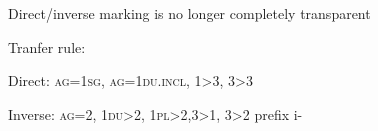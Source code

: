 \begin{frame}
\begin{smallwideitemize}\footnotesize
\item Direct/inverse marking is no longer completely transparent
\item Tranfer rule:
\begin{smallwideitemize}\footnotesize
\item Direct: \textsc{ag=1sg, ag=1du.incl, 1>3, 3>3}
\item Inverse: \textsc{ag=2, 1du>2, 1pl>2,3>1, 3>2} \ra prefix {\textglotstop}i-
\end{smallwideitemize}
\end{smallwideitemize}


  \end{frame} 


